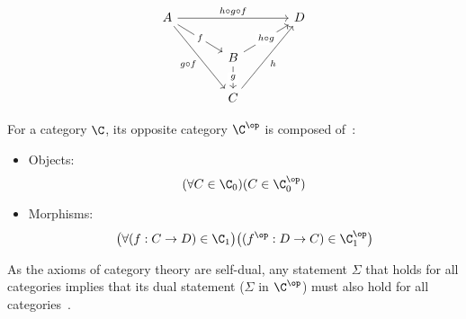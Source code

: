 \begin{example}
  \[\begin{tikzcd}[ampersand replacement=\&,column sep=scriptsize]
    A \&\&\&\& D \\
    \&\& B \\
    \&\& C
    \arrow["f"{description}, from=1-1, to=2-3]
    \arrow["g"{description}, from=2-3, to=3-3]
    \arrow["h"', from=3-3, to=1-5]
    \arrow["{g\circ f}"', from=1-1, to=3-3]
    \arrow["{h\circ g}"{description}, from=2-3, to=1-5]
    \arrow["{h\circ g\circ f}", from=1-1, to=1-5]
  \end{tikzcd}\]
\end{example}

\begin{definition}

  For a category $\C$, its opposite category $\C^\op$ is composed
  of~\parencite[p.~15]{awodey:category_theory}:

  \begin{itemize}
    \item Objects:
      \[(\forall C \in \C_0)
        (C\in \C^\op_0)\]
    \item Morphisms:
      \[\big(\forall (f: C\to D) \in \C_1\big)
        \big((f^\op : D\to C)\in \C^\op_1\big)\]
  \end{itemize}
\end{definition}

\begin{remark}
  As the axioms of category theory are self-dual, any statement $\Sigma$ that
  holds for all categories implies that its dual statement ($\Sigma$ in
  $\C^\op$) must also hold for all
  categories~\parencite[p.~16]{leinster:basic_category_theory}.
\end{remark}





